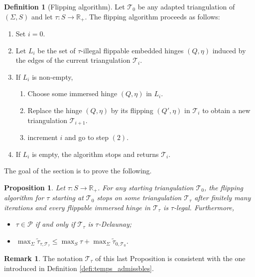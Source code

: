 \documentclass[a4paper,12pt]{article}
\def\TT{\mathcal T}
\def\adm{\P}
\def\RR{\mathbb{R}}
\def\adm{\mathcal{P}}
\def\P{\mathcal{P}}
\newcommand{\tautilde}[2]{\widetilde\tau_{#1,#2}}
\newtheorem{prop}[lem]{Proposition}
\theoremstyle{definition}
\newtheorem{defi}[lem]{Definition}	%
\newtheorem*{rem}{Remark}			 %
\begin{document}
						
						\begin{defi}[Flipping algorithm]
							Let $\TT_0$ be any adapted triangulation of $(\Sigma, S)$ and let $\tau: S \rightarrow \RR_+$.
							The flipping algorithm proceeds as follows:
								\begin{enumerate}
								\item Set $i=0$.
								\item Let $L_i$ be the set of $\tau$-illegal flippable embedded hinges $(Q,\eta)$ induced by the edges of the current triangulation $\TT_i$.
								\item If $L_i$ is non-empty,
									\begin{enumerate}
										\item Choose some immersed hinge $(Q,\eta)$ in $L_i$.
										\item Replace the hinge $(Q,\eta)$ by its flipping $(Q',\eta)$ in $\TT_i$ to obtain a new
										triangulation $\TT_{i+1}$.
										\item increment $i$ and go to step $(2)$.
									\end{enumerate}
								\item If $L_i$ is empty, the algorithm stops and returns $\TT_i$.
							 \end{enumerate}
						\end{defi}
						The goal of the section is to prove the following.
						\begin{prop} \label{prop:algo_stop}
						 Let $\tau: S\rightarrow \RR_+$.
						 For any starting triangulation $\TT_0$, the flipping algorithm for $\tau$ starting at $\TT_0$
						 stops on some triangulation $\TT_\tau$ after finitely many iterations and every flippable immersed hinge in $\TT_\tau$ is $\tau$-legal. 
						 Furthermore, 
						 
						 \begin{itemize}
						 \item $\tau\in \adm$ if and only if $\TT_\tau$ is $\tau$-Delaunay;
						 \item $\displaystyle\max_\Sigma\tautilde{\tau}{\TT_\tau}\leq \max_S \tau + \max_\Sigma \tautilde{0}{\TT_0}$.
						 \end{itemize}
						\end{prop}
						\begin{rem} The notation $\TT_\tau$ of this last Proposition is consistent with the one introduced in Definition \ref{defi:temps_admissbles}.
						 
						\end{rem}
\end{document}
